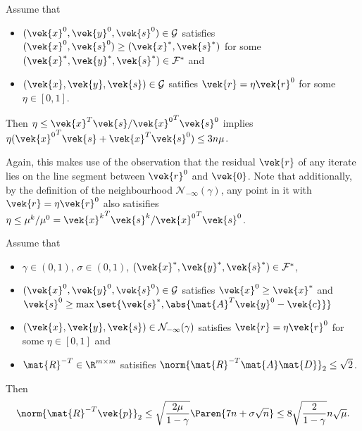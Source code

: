 \begin{lemma}\label{thm:eta-bound}
  Assume that
  \begin{itemize}
    \item \((\vek{x}^0, \vek{y}^0, \vek{s}^0) \in \mathcal{G}\) satisfies \((\vek{x}^0, \vek{s}^0) \geq (\vek{x}^*, \vek{s}^*)\) for some \((\vek{x}^*, \vek{y}^*, \vek{s}^*) \in \mathcal{F}^*\) and
    \item \((\vek{x}, \vek{y}, \vek{s}) \in \mathcal{G}\) satifies \(\vek{r} = \eta \vek{r}^0\) for some \(\eta \in [0, 1]\).
  \end{itemize}
  Then \(\eta \leq \vek{x}^T \vek{s} / {\vek{x}^0}^T \vek{s}^0\) implies \(\eta ({\vek{x}^0}^T \vek{s} + \vek{x}^T {\vek{s}^0}) \leq 3 n \mu\).
\end{lemma}

Again, this makes use of the observation that the residual \(\vek{r}\) of any iterate lies on the line segment between \(\vek{r}^0\) and \(\vek{0}\).
Note that additionally, by the definition of the neighbourhood \(\mathcal{N}_{-\infty}(\gamma)\), any point in it with \(\vek{r} = \eta \vek{r}^0\) also satisifies \(\eta \leq \mu^k / \mu^0 = {\vek{x}^k}^T \vek{s}^k / {\vek{x}^0}^T \vek{s}^0\).

\begin{lemma}\label{thm:initial-residual-bound}
  Assume that
  \begin{itemize}
    \item \(\gamma \in (0, 1)\), \(\sigma \in (0, 1)\), \((\vek{x}^*, \vek{y}^*, \vek{s}^*) \in \mathcal{F}^*\),
    \item \((\vek{x}^0, \vek{y}^0, \vek{s}^0) \in \mathcal{G}\) satisfies \(\vek{x}^0 \geq \vek{x}^*\) and \(\vek{s}^0 \geq \max\set{\vek{s}^*, \abs{\mat{A}^T\vek{y}^0 - \vek{c}}}\)
    \item \((\vek{x}, \vek{y}, \vek{s}) \in \mathcal{N}_{-\infty}(\gamma)\) satisfies \(\vek{r} = \eta \vek{r}^0\) for some \(\eta \in [0, 1]\) and
    \item \(\mat{R}^{-T} \in \R^{m \times m}\) satisifies \(\norm{\mat{R}^{-T}\mat{A}\mat{D}}_2 \leq \sqrt{2}\).
  \end{itemize}
  Then
  \[ \norm{\mat{R}^{-T} \vek{p}}_2 \leq \sqrt{\frac{2 \mu}{1 - \gamma}} \Paren{7n + \sigma \sqrt{n}} \leq 8 \sqrt{\frac{2}{1 - \gamma}} n \sqrt{\mu}. \]
\end{lemma}

